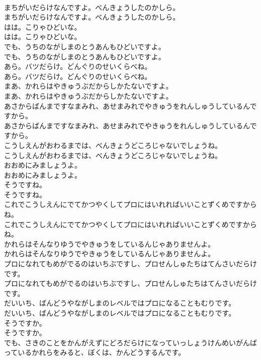 \documentclass[8pt]{extreport}
\begin{document}
\begin{CJK}{UTF8}{min}
\\	まちがいだらけなんですよ。べんきょうしたのかしら。
\\	まちがいだらけなんですよ。べんきょうしたのかしら。
\\	はは。こりゃひどいな。
\\	はは。こりゃひどいな。
\\	でも、うちのながしまのとうあんもひどいですよ。
\\	でも、うちのながしまのとうあんもひどいですよ。
\\	あら。バツだらけ。どんぐりのせいくらべね。
\\	あら。バツだらけ。どんぐりのせいくらべね。
\\	まあ、かれらはやきゅうぶだからしかたないですよ。
\\	まあ、かれらはやきゅうぶだからしかたないですよ。
\\	あさからばんまですなまみれ、あせまみれでやきゅうをれんしゅうしているんですから。
\\	あさからばんまですなまみれ、あせまみれでやきゅうをれんしゅうしているんですから。
\\	こうしえんがおわるまでは、べんきょうどころじゃないでしょうね。
\\	こうしえんがおわるまでは、べんきょうどころじゃないでしょうね。
\\	おおめにみましょうよ。
\\	おおめにみましょうよ。
\\	そうですね。
\\	そうですね。
\\	これでこうしえんにでてかつやくしてプロにはいれればいいことずくめですからね。
\\	これでこうしえんにでてかつやくしてプロにはいれればいいことずくめですからね。
\\	かれらはそんなりゆうでやきゅうをしているんじゃありませんよ。
\\	かれらはそんなりゆうでやきゅうをしているんじゃありませんよ。
\\	プロになれてもめがでるのはいちぶですし、プロせんしゅたちはてんさいだらけです。
\\	プロになれてもめがでるのはいちぶですし、プロせんしゅたちはてんさいだらけです。
\\	だいいち、ばんどうやながしまのレベルではプロになることもむりです。
\\	だいいち、ばんどうやながしまのレベルではプロになることもむりです。
\\	そうですか。
\\	そうですか。
\\	でも、さきのことをかんがえずにどろだらけになっていっしょうけんめいがんばっているかれらをみると、ぼくは、かんどうするんです。

\end{CJK}
\end{document}
